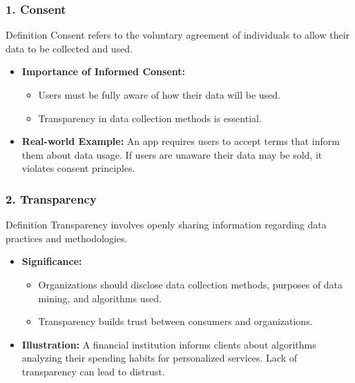 \documentclass[aspectratio=169]{beamer}
\begin{document}
\begin{frame}[fragile]
    \frametitle{1. Consent}
    \begin{block}{Definition}
        Consent refers to the voluntary agreement of individuals to allow their data to be collected and used.
    \end{block}
    
    \begin{itemize}
        \item \textbf{Importance of Informed Consent:}
        \begin{itemize}
            \item Users must be fully aware of how their data will be used.
            \item Transparency in data collection methods is essential.
        \end{itemize}
        \item \textbf{Real-world Example:}
        An app requires users to accept terms that inform them about data usage. If users are unaware their data may be sold, it violates consent principles.
    \end{itemize}
\end{frame}

\begin{frame}[fragile]
    \frametitle{2. Transparency}
    \begin{block}{Definition}
        Transparency involves openly sharing information regarding data practices and methodologies.
    \end{block}
    
    \begin{itemize}
        \item \textbf{Significance:}
        \begin{itemize}
            \item Organizations should disclose data collection methods, purposes of data mining, and algorithms used.
            \item Transparency builds trust between consumers and organizations.
        \end{itemize}
    
        \item \textbf{Illustration:}
        A financial institution informs clients about algorithms analyzing their spending habits for personalized services. Lack of transparency can lead to distrust.
    \end{itemize}
\end{frame}
\end{document}
